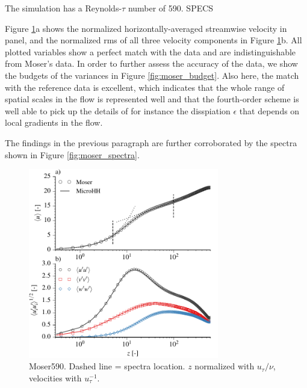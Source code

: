 \documentclass[gmd]{copernicus}
\begin{document}
The simulation has a Reynolds-$\tau$ number of 590. SPECS

Figure \ref{fig:moser_velocity}a shows the normalized horizontally-averaged streamwise velocity in panel, and the normalized rms of all three velocity components in Figure \ref{fig:moser_velocity}b. All plotted variables show a perfect match with the data and are indistinguishable from Moser's data. In order to further assess the accuracy of the data, we show the budgets of the variances in Figure \ref{fig:moser_budget}. Also here, the match with the reference data is excellent, which indicates that the whole range of spatial scales in the flow is represented well and that the fourth-order scheme is well able to pick up the details of for instance the disspiation $\epsilon$ that depends on local gradients in the flow.

The findings in the previous paragraph are further corroborated by the spectra shown in Figure \ref{fig:moser_spectra}.  

\begin{figure}[t]
\vspace*{2mm}
\begin{center}
\includegraphics[width=8.3cm]{figs/gmd_m590_umean_var.pdf}
\end{center}
\caption{Moser590. Dashed line = spectra location. $z$ normalized with $u_\tau / \nu$, velocities with $u_\tau^{-1}$.}\label{fig:moser_velocity}
\end{figure}
\end{document}
